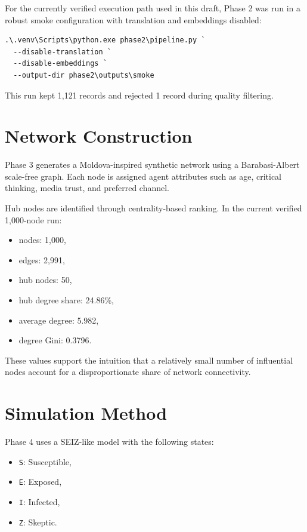 \documentclass[11pt,a4paper]{article}
\begin{document}
For the currently verified execution path used in this draft, Phase 2 was run in a robust smoke configuration with translation and embeddings disabled:

\begin{verbatim}
.\.venv\Scripts\python.exe phase2\pipeline.py `
  --disable-translation `
  --disable-embeddings `
  --output-dir phase2\outputs\smoke
\end{verbatim}

This run kept 1,121 records and rejected 1 record during quality filtering.

\section{Network Construction}
Phase 3 generates a Moldova-inspired synthetic network using a Barabasi-Albert scale-free graph. Each node is assigned agent attributes such as age, critical thinking, media trust, and preferred channel.

Hub nodes are identified through centrality-based ranking. In the current verified 1,000-node run:

\begin{itemize}
  \item nodes: 1,000,
  \item edges: 2,991,
  \item hub nodes: 50,
  \item hub degree share: 24.86\%,
  \item average degree: 5.982,
  \item degree Gini: 0.3796.
\end{itemize}

These values support the intuition that a relatively small number of influential nodes account for a disproportionate share of network connectivity.

\section{Simulation Method}
Phase 4 uses a SEIZ-like model with the following states:

\begin{itemize}
  \item \texttt{S}: Susceptible,
  \item \texttt{E}: Exposed,
  \item \texttt{I}: Infected,
  \item \texttt{Z}: Skeptic.
\end{itemize}
\end{document}
